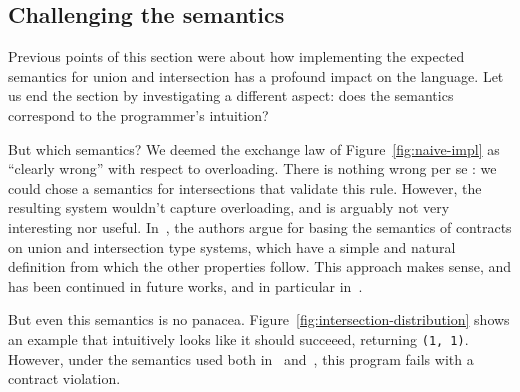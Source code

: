 \documentclass[sigplan,10pt,review,anonymous]{acmart}
\newcommand{\nickel}[1]{\lstinline[language=nickel]{#1}}
\begin{document}
\subsection{Challenging the semantics}


Previous points of this section were about how implementing the expected
semantics for union and intersection has a profound impact on the language. Let
us end the section by investigating a different aspect: does the
semantics correspond to the programmer's intuition?

But which semantics? We deemed the exchange law of Figure~\ref{fig:naive-impl}
as ``clearly wrong'' with respect to overloading. There is nothing wrong per se :
we could chose a semantics for intersections that validate this rule.  However,
the resulting system wouldn't capture overloading, and is arguably not very
interesting nor useful. In~\cite{KeilThiemannUnionIntersection}, the authors
argue for basing the semantics of contracts on union and intersection type
systems, which have a simple and natural definition from which the other
properties follow. This approach makes sense, and has been continued in future
works, and in particular in~\cite{RootCauseOfBlame}.

But even this semantics is no panacea. Figure~\ref{fig:intersection-distribution}
shows an example that intuitively looks like it should succeeed, returning
\nickel{(1, 1)}. However, under the semantics used both
in~\cite{KeilThiemannUnionIntersection} and~\cite{RootCauseOfBlame}, this program
fails with a contract violation.

%
%
%
\end{document}
